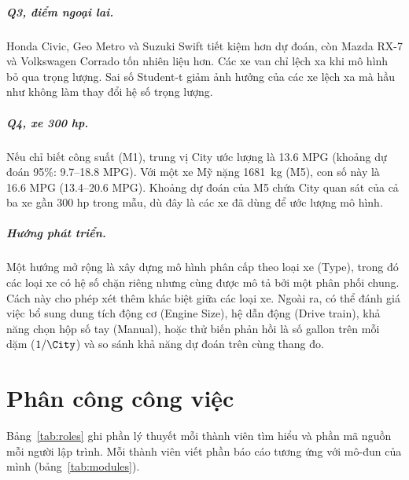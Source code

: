 \documentclass[12pt,a4paper]{report}
\begin{document}
\paragraph{Q3, điểm ngoại lai.} Honda Civic, Geo Metro và Suzuki Swift tiết
kiệm hơn dự đoán, còn Mazda RX-7 và Volkswagen Corrado tốn nhiên liệu hơn. Các
xe van chỉ lệch xa khi mô hình bỏ qua trọng lượng. Sai số Student-t giảm ảnh
hưởng của các xe lệch xa mà hầu như không làm thay đổi hệ số trọng lượng.

\paragraph{Q4, xe 300 hp.} Nếu chỉ biết công suất (M1), trung vị City ước
lượng là \num{13.6} MPG (khoảng dự đoán 95\%: \num{9.7}--\num{18.8} MPG). Với
một xe Mỹ nặng \SI{1681}{kg} (M5), con số này là \num{16.6} MPG
(\num{13.4}--\num{20.6} MPG). Khoảng dự đoán của M5 chứa City quan sát của cả ba xe
gần 300 hp trong mẫu, dù đây là các xe đã dùng để ước lượng mô hình.

\paragraph{Hướng phát triển.} Một hướng mở rộng là xây dựng mô hình phân cấp theo
loại xe (Type), trong đó các loại xe có hệ số chặn riêng nhưng cùng được mô
tả bởi một phân phối chung. Cách này cho phép xét thêm khác biệt giữa các loại
xe. Ngoài ra, có thể đánh giá việc bổ sung dung tích động cơ (Engine Size), hệ
dẫn động (Drive train), khả năng chọn hộp số tay (Manual), hoặc thử biến phản
hồi là số gallon trên mỗi dặm ($1/\City$) và so sánh khả năng dự đoán trên cùng
thang đo.

\appendix

\chapter{Phân công công việc}
\label{sec:roles}

Bảng~\ref{tab:roles} ghi phần lý thuyết mỗi thành viên tìm hiểu và phần mã
nguồn mỗi người lập trình. Mỗi thành viên viết phần báo cáo tương ứng với mô-đun của mình
(bảng~\ref{tab:modules}).
\end{document}
